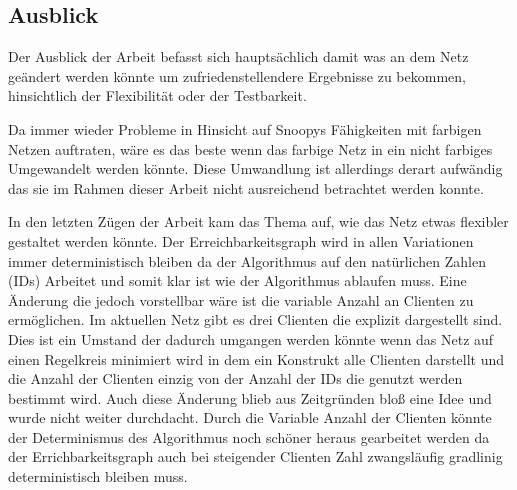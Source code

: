 \subsection{Ausblick}
Der Ausblick der Arbeit befasst sich hauptsächlich damit was an dem Netz geändert werden könnte um zufriedenstellendere Ergebnisse zu bekommen, hinsichtlich der Flexibilität oder der Testbarkeit.

Da immer wieder Probleme in Hinsicht auf Snoopys Fähigkeiten mit farbigen Netzen auftraten, wäre es das beste wenn das farbige Netz in ein nicht farbiges Umgewandelt werden könnte. Diese Umwandlung ist allerdings derart aufwändig das sie im Rahmen dieser Arbeit nicht ausreichend betrachtet werden konnte. 

In den letzten Zügen der Arbeit kam das Thema auf, wie das Netz etwas flexibler gestaltet werden könnte. Der Erreichbarkeitsgraph wird in allen Variationen immer deterministisch bleiben da der Algorithmus auf den natürlichen Zahlen (IDs) Arbeitet und somit klar ist wie der Algorithmus ablaufen muss. Eine Änderung die jedoch vorstellbar wäre ist die variable Anzahl an Clienten zu ermöglichen. Im aktuellen Netz gibt es drei Clienten die explizit dargestellt sind. Dies ist ein Umstand der dadurch umgangen werden könnte wenn das Netz auf einen Regelkreis minimiert wird in dem ein Konstrukt alle Clienten darstellt und die Anzahl der Clienten einzig von der Anzahl der IDs die genutzt werden bestimmt wird.
Auch diese Änderung blieb aus Zeitgründen bloß eine Idee und wurde nicht weiter durchdacht. Durch die Variable Anzahl der Clienten könnte der Determinismus des Algorithmus noch schöner heraus gearbeitet werden da der Errichbarkeitsgraph auch bei steigender Clienten Zahl zwangsläufig gradlinig deterministisch bleiben muss.
